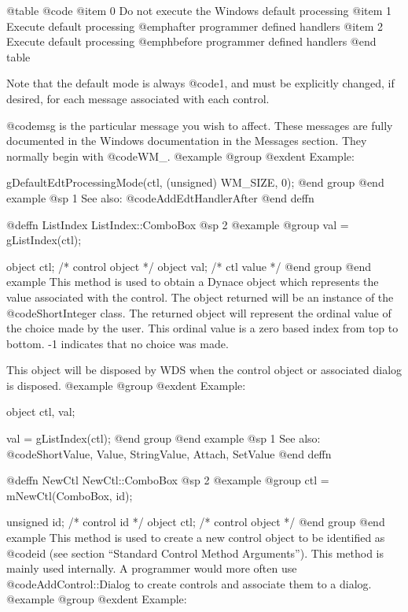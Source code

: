 @table @code
@item 0
Do not execute the Windows default processing
@item 1
Execute default processing @emph{after} programmer defined handlers
@item 2
Execute default processing @emph{before} programmer defined handlers
@end table

Note that the default mode is always @code{1}, and must be explicitly
changed, if desired, for each message associated with each control.

@code{msg} is the particular message you wish to affect.  These messages
are fully documented in the Windows documentation in the Messages
section.  They normally begin with @code{WM_}.
@example
@group
@exdent Example:

gDefaultEdtProcessingMode(ctl, (unsigned) WM_SIZE, 0);
@end group
@end example
@sp 1
See also:  @code{AddEdtHandlerAfter}
@end deffn

















@deffn {ListIndex} ListIndex::ComboBox
@sp 2
@example
@group
val = gListIndex(ctl);

object  ctl;   /*  control object  */
object  val;   /*  ctl value       */
@end group
@end example
This method is used to obtain a Dynace object which represents the value
associated with the control.  The object returned will be an instance of
the @code{ShortInteger} class.  The returned object will represent the
ordinal value of the choice made by the user.  This ordinal value is a
zero based index from top to bottom.  -1 indicates that no choice was
made.

This object will be disposed by WDS when the control object or
associated dialog is disposed.
@example
@group
@exdent Example:

object  ctl, val;

val = gListIndex(ctl);
@end group
@end example
@sp 1
See also:  @code{ShortValue, Value, StringValue, Attach, SetValue}
@end deffn




@deffn {NewCtl} NewCtl::ComboBox
@sp 2
@example
@group
ctl = mNewCtl(ComboBox, id);

unsigned  id;   /*  control id      */
object   ctl;   /*  control object  */
@end group
@end example
This method is used to create a new control object to be identified as
@code{id} (see section ``Standard Control Method Arguments'').  This
method is mainly used internally.  A programmer would more often
use @code{AddControl::Dialog} to create controls and associate them
to a dialog.
@example
@group
@exdent Example:

